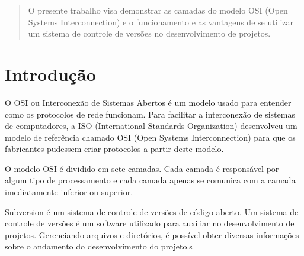 \begin{abstract}

O presente trabalho visa demonstrar as camadas do modelo OSI (Open Systems Interconnection) e o funcionamento e as vantagens de se utilizar um sistema de controle de versões no desenvolvimento de projetos.

\end{abstract}

\newpage

\section{Introdução}

O OSI  ou Interconexão de Sistemas Abertos é um modelo usado para entender como os protocolos de rede funcionam. Para facilitar a interconexão de sistemas de computadores, a ISO (International Standards Organization) desenvolveu um modelo de referência chamado OSI (Open Systems Interconnection) para que os fabricantes pudessem criar protocolos a partir deste modelo.

O modelo OSI é dividido em sete camadas. Cada camada é responsável por algum tipo de processamento e cada camada apenas se comunica com a camada imediatamente inferior ou superior.

Subversion é um sistema de controle de versões de código aberto. Um sistema de controle de versões é um software utilizado para auxiliar no desenvolvimento de projetos. Gerenciando arquivos e diretórios, é possível obter diversas informações sobre o andamento do desenvolvimento do projeto.s